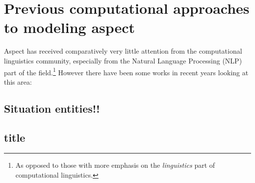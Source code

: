 \section{Previous computational approaches to modeling aspect}
Aspect has received comparatively very little attention from the computational linguistics community\citep{friedrich-etal-2023-kind}, especially from the Natural Language Processing (NLP) part of the field.\footnote{As opposed to those with more emphasis on the \emph{linguistics} part of computational linguistics.} However there have been some works in recent years looking at this area:

\subsection{Situation entities!!}

\subsection*{title}
